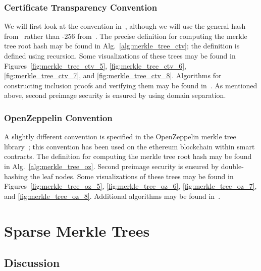 \subsubsection{Certificate Transparency Convention}

We will first look at the convention in~\cite{rfc6962,rfc9162},
although we will use the general hash from~\cite{rfc9162}
rather than \ShaTwo{}-256 from~\cite{rfc6962}.
The precise definition for computing the \gls{merkle tree}
root hash may be found in Alg.~\ref{alg:merkle_tree_ctv};
the definition is defined using \gls{recursion}.
Some visualizations of these trees may be found in
Figures~\ref{fig:merkle_tree_ctv_5},
\ref{fig:merkle_tree_ctv_6},
\ref{fig:merkle_tree_ctv_7}, and
\ref{fig:merkle_tree_ctv_8}.
Algorithms for constructing inclusion proofs and verifying them
may be found in~\cite{rfc9162}.
As mentioned above, second preimage security is ensured by
using domain separation.




\subsubsection{OpenZeppelin Convention}

A slightly different convention is specified in the OpenZeppelin
\gls{merkle tree} library~\cite{MerkleTreeOZ};
this convention has been used on the \gls{ethereum} blockchain
within \glspl{smart contract}.
The definition for computing the \gls{merkle tree}
root hash may be found in Alg.~\ref{alg:merkle_tree_oz}.
Second preimage security is ensured by double-hashing the leaf nodes.
Some visualizations of these trees may be found in
Figures~\ref{fig:merkle_tree_oz_5},
\ref{fig:merkle_tree_oz_6},
\ref{fig:merkle_tree_oz_7}, and
\ref{fig:merkle_tree_oz_8}.
Additional algorithms may be found in~\cite{MerkleTreeOZ}.





\section{Sparse Merkle Trees}
\label{sec:sparse_merkle_trees}

\subsection{Discussion}

